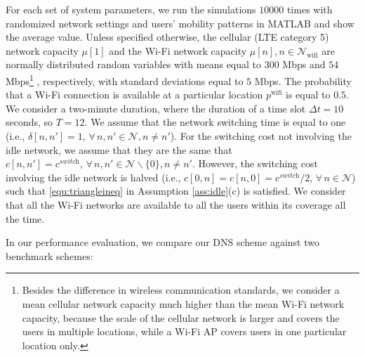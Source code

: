 \documentclass[journal]{IEEEtran}
\begin{document}
  For each set of system parameters, we run the simulations $10000$ times with randomized network settings and users' mobility patterns in MATLAB and show the average value.
  Unless specified otherwise, the cellular (LTE category 5) network capacity $\mu[1]$ and the Wi-Fi network capacity $\mu[n], n \in \mathcal{N}_{\text{wifi}}$ are normally distributed random variables with means equal to $300$ Mbps \cite{wiki_eutra} and $54$ Mbps\footnote{Besides the difference in wireless communication standards, we consider a mean cellular network capacity much higher than the mean Wi-Fi network capacity, because the scale of the cellular network is larger and covers the users in multiple locations, while a Wi-Fi AP covers users in one particular location only.} \cite{ieee80211std}, respectively, with standard deviations equal to $5$ Mbps. %
  The probability that a Wi-Fi connection is available at a particular location $p^{\text{wifi}}$ is equal to $0.5$.
  We consider a two-minute duration, where the duration of a time slot $\Delta t = 10$ seconds, so $T = 12$.
	We assume that the network switching time is equal to one (i.e., $\delta[n,n'] = 1, \, \forall \, n,n' \in \mathcal{N}, n \neq n'$).
  For the switching cost not involving the idle network, we assume that they are the same that $c[n,n'] = c^{\textit{switch}}, \, \forall \, n,n' \in \mathcal{N} \backslash \{0\}, n \neq n'$.
	However, the switching cost involving the idle network is halved (i.e., $c[0,n] = c[n,0] = c^{\textit{switch}} / 2, \, \forall \, n \in \mathcal{N}$) such that \eqref{equ:triangleineq} in Assumption \ref{ass:idle}(c) is satisfied.	
  We consider that all the Wi-Fi networks are available to all the users within its coverage all the time.
  
	In our performance evaluation, we compare our DNS scheme against two benchmark schemes:
	
\end{document}

